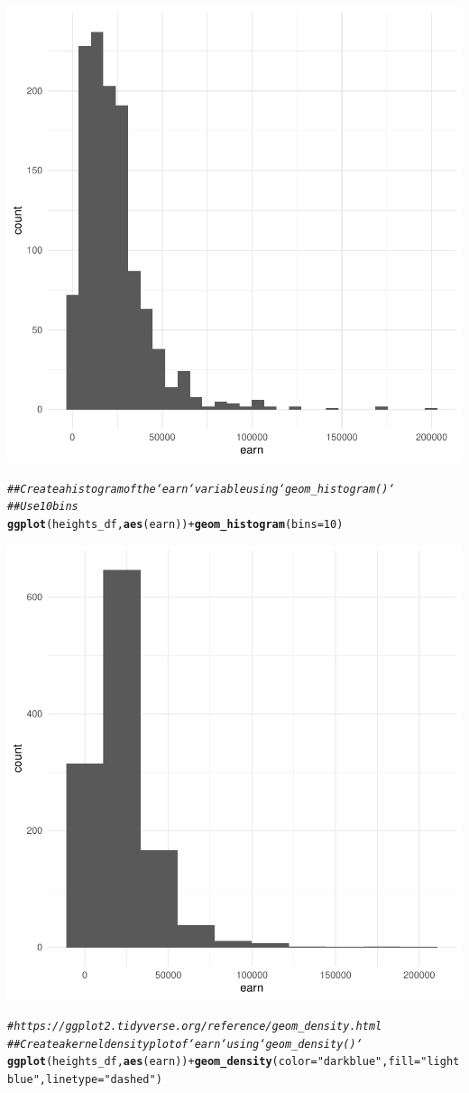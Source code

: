 \documentclass{article}\usepackage[]{graphicx}\usepackage[]{xcolor}
\makeatletter
\newcommand{\hlnum}[1]{\textcolor[rgb]{0.686,0.059,0.569}{#1}}%
\newcommand{\hlstr}[1]{\textcolor[rgb]{0.192,0.494,0.8}{#1}}%
\newcommand{\hlcom}[1]{\textcolor[rgb]{0.678,0.584,0.686}{\textit{#1}}}%
\newcommand{\hlopt}[1]{\textcolor[rgb]{0,0,0}{#1}}%
\newcommand{\hlstd}[1]{\textcolor[rgb]{0.345,0.345,0.345}{#1}}%
\newcommand{\hlkwc}[1]{\textcolor[rgb]{0.333,0.667,0.333}{#1}}%
\newcommand{\hlkwd}[1]{\textcolor[rgb]{0.737,0.353,0.396}{\textbf{#1}}}%
\newenvironment{kframe}{%
 \def\at@end@of@kframe{}%
 \ifinner\ifhmode%
  \def\at@end@of@kframe{\end{minipage}}%
  \begin{minipage}{\columnwidth}%
 \fi\fi%
 \def\FrameCommand##1{\hskip\@totalleftmargin \hskip-\fboxsep
 \colorbox{shadecolor}{##1}\hskip-\fboxsep
     \hskip-\linewidth \hskip-\@totalleftmargin \hskip\columnwidth}%
 \MakeFramed {\advance\hsize-\width
   \@totalleftmargin\z@ \linewidth\hsize
   \@setminipage}}%
 {\par\unskip\endMakeFramed%
 \at@end@of@kframe}
\newenvironment{knitrout}{}{} %
\makeatother
\begin{document}
\begin{knitrout}
{\centering \includegraphics[width=.6\linewidth]{figure/assignment-03-ChattapadhyayKausik-Rnwauto-report-9} 

}


\begin{kframe}\begin{alltt}
\hlcom{## Create a histogram of the `earn` variable using `geom_histogram()`}
\hlcom{## Use 10 bins}
\hlkwd{ggplot}\hlstd{(heights_df,} \hlkwd{aes}\hlstd{(earn))} \hlopt{+} \hlkwd{geom_histogram}\hlstd{(}\hlkwc{bins} \hlstd{=} \hlnum{10}\hlstd{)}
\end{alltt}
\end{kframe}

{\centering \includegraphics[width=.6\linewidth]{figure/assignment-03-ChattapadhyayKausik-Rnwauto-report-10} 

}


\begin{kframe}\begin{alltt}
\hlcom{# https://ggplot2.tidyverse.org/reference/geom_density.html}
\hlcom{## Create a kernel density plot of `earn` using `geom_density()`}
\hlkwd{ggplot}\hlstd{(heights_df,} \hlkwd{aes}\hlstd{(earn))} \hlopt{+}  \hlkwd{geom_density}\hlstd{(}\hlkwc{color}\hlstd{=}\hlstr{"darkblue"}\hlstd{,} \hlkwc{fill}\hlstd{=}\hlstr{"lightblue"}\hlstd{,} \hlkwc{linetype}\hlstd{=}\hlstr{"dashed"}\hlstd{)}
\end{alltt}
\end{kframe}


\end{knitrout}
\end{document}
